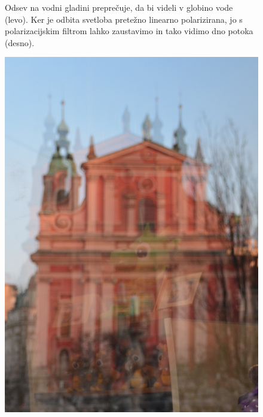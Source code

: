 \begin{remark}
\begin{figure}[ht]
\caption{Odsev na vodni gladini preprečuje, da bi videli v globino vode (levo).
Ker je odbita svetloba pretežno linearno polarizirana, jo s polarizacijskim 
filtrom lahko zaustavimo in tako vidimo dno potoka (desno).}
\label{fig:04_odsevvoda}
\end{figure}

\begin{figure}[ht]
\centering
\includegraphics[width=5truecm]{slike/04_photos_zmaj2.jpg}\qquad \qquad

\end{figure}
\end{remark}
